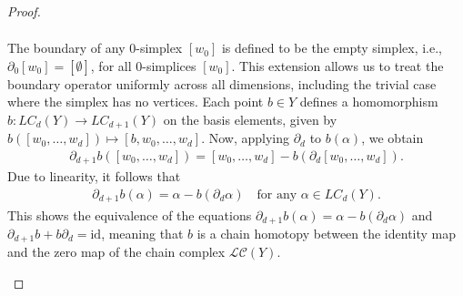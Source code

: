\begin{proof}{\textit{\cite[Proof of Proposition 2.21]{hatcher2005algebraic}}}
\begin{enumerate}
\begin{align}
	\end{align}
	The boundary of any \(0\)-simplex \([w_0]\) is defined to be the empty simplex, i.e., $\partial_0[w_0] = [\emptyset]$, for all \(0\)-simplices \([w_0]\). This extension allows us to treat the boundary operator uniformly across all dimensions, including the trivial case where the simplex has no vertices. Each point \(b \in Y\) defines a homomorphism \(b: LC_d(Y) \rightarrow LC_{d+1}(Y)\) on the basis elements, given by $b([w_0, \ldots, w_d]) \mapsto [b, w_0, \ldots, w_d]$. Now, applying \(\partial_d\) to \(b(\alpha)\), we obtain
	\begin{align}
		\partial_{d+1} b([w_0, \ldots, w_d]) = [w_0, \ldots, w_d] - b(\partial_d [w_0, \ldots, w_d]). 
	\end{align}
	Due to linearity, it follows that 
	\begin{align}
		\partial_{d+1} b(\alpha) = \alpha - b(\partial_d \alpha) \quad \text{for any } \alpha \in LC_d(Y). 
	\end{align}
	This shows the equivalence of the equations \(\partial_{d+1} b(\alpha) = \alpha - b(\partial_d \alpha)\) and \(\partial_{d+1} b + b \partial_d = \text{id}\), meaning that \(b\) is a chain homotopy between the identity map and the zero map of the chain complex \(\mathcal{LC}(Y)\).
		

\end{enumerate}
\end{proof}
